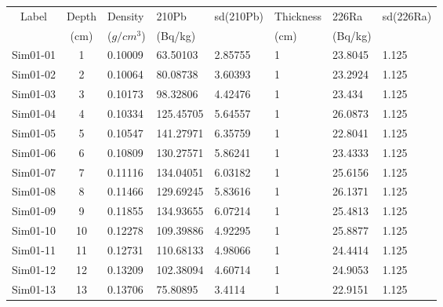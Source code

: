 \documentclass [10pt] {article}
\begin{document}
\begin{table}[h]
	\begin{tabular}{c|cllllll}
		Label    & Depth & Density  & 210Pb & sd(210Pb) & Thickness& 226Ra  & sd(226Ra) \\
		& (cm) &($g/cm^3$) &(Bq/kg)& & (cm) & (Bq/kg)&\\
		\hline 
		Sim01-01 & 1          & 0.10009                         & 63.50103      & 2.85755   & 1              & 23.8045       & 1.125     \\
		Sim01-02 & 2          & 0.10064                         & 80.08738      & 3.60393   & 1              & 23.2924       & 1.125     \\
		Sim01-03 & 3          & 0.10173                         & 98.32806      & 4.42476   & 1              & 23.434        & 1.125     \\
		Sim01-04 & 4          & 0.10334                         & 125.45705     & 5.64557   & 1              & 26.0873       & 1.125     \\
		Sim01-05 & 5          & 0.10547                         & 141.27971     & 6.35759   & 1              & 22.8041       & 1.125     \\
		Sim01-06 & 6          & 0.10809                         & 130.27571     & 5.86241   & 1              & 23.4333       & 1.125     \\
		Sim01-07 & 7          & 0.11116                         & 134.04051     & 6.03182   & 1              & 25.6156       & 1.125     \\
		Sim01-08 & 8          & 0.11466                         & 129.69245     & 5.83616   & 1              & 26.1371       & 1.125     \\
		Sim01-09 & 9          & 0.11855                         & 134.93655     & 6.07214   & 1              & 25.4813       & 1.125     \\
		Sim01-10 & 10         & 0.12278                         & 109.39886     & 4.92295   & 1              & 25.8877       & 1.125     \\
		Sim01-11 & 11         & 0.12731                         & 110.68133     & 4.98066   & 1              & 24.4414       & 1.125     \\
		Sim01-12 & 12         & 0.13209                         & 102.38094     & 4.60714   & 1              & 24.9053       & 1.125     \\
		Sim01-13 & 13         & 0.13706                         & 75.80895      & 3.4114    & 1              & 22.9151       & 1.125     \\

\end{tabular}
\end{table}
\end{document}

